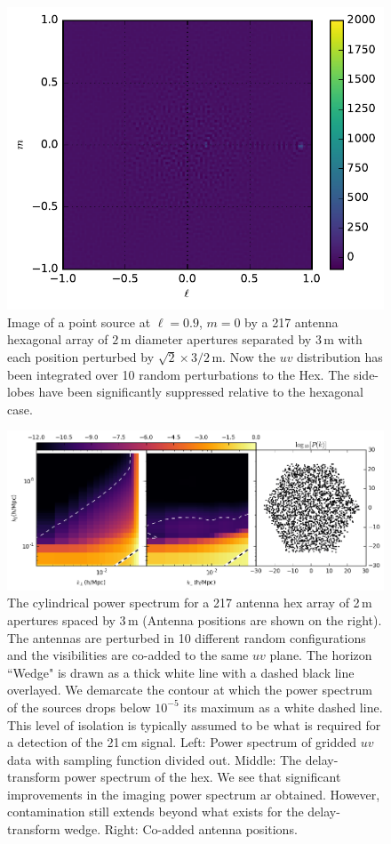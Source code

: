 \documentclass[a4paper,fleqn,usenatbib]{mnras}
\begin{document}
\begin{figure}
\includegraphics[width=.5\textwidth]{image_offZenith_217Ant_pHex_10config_dant_2_dantpos_3.pdf}
\caption{Image of a point source at $\ell=0.9$, $m=0$ by a 217 antenna hexagonal array of $2$\,m diameter apertures separated by $3$\,m with each position perturbed by $\sqrt{2}\times 3/2$\,m. Now the $uv$ distribution has been integrated over 10 random perturbations to the Hex. The side-lobes have been significantly suppressed relative to the hexagonal case.}
\label{fig:ImageHexPerturbedDefault_10Config}
\end{figure}

\begin{figure}
\includegraphics[width=\textwidth]{power_spectrum_hex_217_dAnt_2_dAntPos_3_perturbedHex_10config.png}
\caption{The cylindrical power spectrum for a 217 antenna hex array of 2\,m apertures spaced by 3\,m (Antenna positions are shown on the right). The antennas are perturbed in 10 different random configurations and the visibilities are co-added to the same $uv$ plane. The horizon ``Wedge" is drawn as a thick white line with a dashed black line overlayed. We demarcate the contour at which the power spectrum of the sources drops below $10^{-5}$ its maximum as a white dashed line. This level of isolation is typically assumed to be what is required for a detection of the 21\,cm signal. Left: Power spectrum of gridded $uv$ data with sampling function divided out. Middle: The delay-transform power spectrum of the hex. We see that significant improvements in the imaging power spectrum ar obtained. However, contamination still extends beyond what exists for the delay-transform wedge. Right: Co-added antenna positions.}
\label{fig:PowerSpectrumPerturbedDefault_10Config}
\end{figure}
\end{document}
